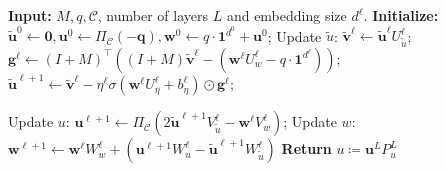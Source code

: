 \documentclass[10pt]{article} %
\begin{document}
\begin{algorithm}[ht]
\caption{DR-GD Net}\label{alg:network}
\begin{algorithmic}[1]
\STATE \textbf{Input:} $M, q, \mathcal{C}$, number of layers $L$ and embedding size $d^\ell$.
\STATE \textbf{Initialize:} $\tilde{\mathbf{u}}^0 \gets \mathbf{0}, \mathbf{u}^0 \gets \Pi_\mathcal{C}(-\mathbf{q}), \mathbf{w}^0 \gets q \cdot \mathbf{1}^{d^0} + \mathbf{u}^0$; 
    \STATE Update $\tilde{u}$: $\tilde{\mathbf{v}}^{\ell} \gets \tilde{\mathbf{u}}^{\ell}U_{\tilde{u}}^\ell$;
    \STATE \hspace{0.2cm} \small{$\mathbf{g}^{\ell} \gets (I+M)^\top\left((I+M)\tilde{\mathbf{v}}^{\ell} - \left(\mathbf{w}^{\ell}U_w^\ell-q\cdot\mathbf{1}^{d^\ell}\right)\right)$;}
    \STATE \hspace{0.2cm} \small{$\tilde{\mathbf{u}}^{\ell+1} \gets \tilde{\mathbf{v}}^{\ell} - \eta^\ell\sigma\left(\mathbf{w}^{\ell}U_\eta^\ell + b_\eta^\ell\right) \odot \mathbf{g}^{\ell}$;}
    
    \STATE Update $u$: $\mathbf{u}^{\ell+1} \gets \Pi_\mathcal{C} \left(2\tilde{\mathbf{u}}^{\ell+1} V_{\tilde{u}}^\ell - \mathbf{w}^{\ell}V_w^\ell \right)$;
    \STATE Update $w$: $\mathbf{w}^{\ell+1} \gets \mathbf{w}^{\ell}W_w^\ell + \left(\mathbf{u}^{\ell+1} W_u^\ell - \tilde{\mathbf{u}}^{\ell+1} W_{\tilde{u}}^\ell \right)$
\ENDFOR
\STATE \textbf{Return} $u \coloneqq \mathbf{u}^L P_u^{L}$
\end{algorithmic}
\end{algorithm}
\end{document}
